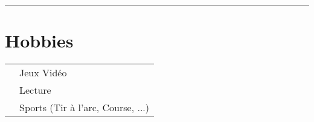 \documentclass[oneside]{article}
\begin{document}
{\begin{minipage}[t][\textheight-2\fboxsep-2\fboxrule][t]{\dimexpr0.40\textwidth-2\fboxrule-2\fboxsep\relax}
        \rule{\linewidth}{0.4pt}
        \section*{\large Hobbies}
        \begin{tabularx}{\textwidth}{cY}
            \faGamepad{} & Jeux Vidéo \\
            \faBookReader{} & Lecture \\
            \faWalking{} & Sports (Tir à l'arc, Course, ...) \\
        \end{tabularx}
        \vspace{.3cm}
        
        \vfill
        
        
    \end{minipage}
}
\hfill
\end{document}
